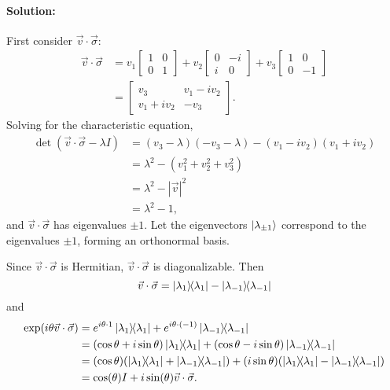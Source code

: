 \paragraph{Solution:} First consider $\vec{v} \cdot \vec{\sigma}$:
\begin{align*}
  \vec{v} \cdot \vec{\sigma} &= v_1 \begin{bmatrix}
      1 & 0 \\
      0 & 1
    \end{bmatrix} + v_2 \begin{bmatrix}
      0 & -i \\
      i & 0
    \end{bmatrix} + v_3 \begin{bmatrix}
      1 & 0 \\
      0 & -1
    \end{bmatrix} \\
    &= \begin{bmatrix}
      v_3 & v_1 - iv_2 \\
      v_1 + iv_2 & - v_3
    \end{bmatrix}.
\end{align*}
Solving for the characteristic equation, \begin{align*}
  \det(\vec{v} \cdot \vec{\sigma} - \lambda I)
    &= (v_3 - \lambda)(-v_3 - \lambda) - (v_1 - iv_2)(v_1 + iv_2) \\
    &= \lambda^2 - (v_1^2 + v_2^2 + v_3^2) \\
    &= \lambda^2 - |\vec{v}|^2 \\
    &= \lambda^2 - 1,
\end{align*} and $\vec{v} \cdot \vec{\sigma}$ has eigenvalues $\pm 1$. Let
the eigenvectors $\ket{\lambda_{\pm 1}}$ correspond to the eigenvalues $\pm 1$,
forming an orthonormal basis.

Since $\vec{v} \cdot \vec{\sigma}$ is Hermitian, $\vec{v} \cdot \vec{\sigma}$
is diagonalizable. Then \begin{equation*}
  \vec{v} \cdot \vec{\sigma} = \ketbra{\lambda_1}{\lambda_1} -
    \ketbra{\lambda_{-1}}{\lambda_{-1}}
\end{equation*}
and \begin{align*}
  \mathrm{exp}(i\theta\vec{v} \cdot \vec{\sigma})
    &= e^{i\theta \cdot 1} \ketbra{\lambda_1}{\lambda_1} +
      e^{i\theta \cdot (-1)} \ketbra{\lambda_{-1}}{\lambda_{-1}} \\
    &= (\cos\theta + i\sin\theta) \ketbra{\lambda_1}{\lambda_1} +
      (\cos\theta - i\sin\theta) \ketbra{\lambda_{-1}}{\lambda_{-1}} \\
    &= (\cos\theta)(\ketbra{\lambda_1}{\lambda_1} + \ketbra{\lambda_{-1}}
      {\lambda_{-1}}) + (i\sin\theta)(\ketbra{\lambda_1}{\lambda_1} -
      \ketbra{\lambda_{-1}}{\lambda_{-1}}) \\
    &= \cos(\theta) I + i\sin(\theta) \vec{v} \cdot \vec{\sigma}.
\end{align*}

